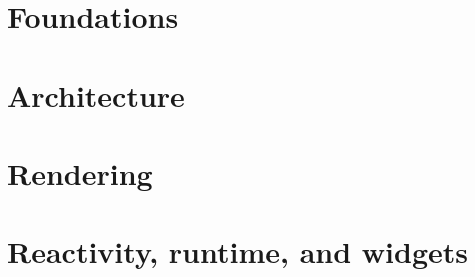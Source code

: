 \documentclass[11pt,openany,oneside]{book}
\begin{document}
\mainmatter

\part{Foundations}




\part{Architecture}






































\part{Rendering}





\part{Reactivity, runtime, and widgets}






\backmatter

\end{document}
